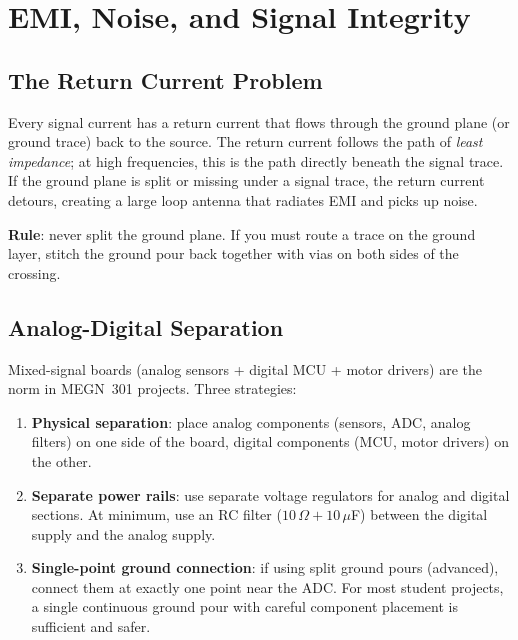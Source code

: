 \documentclass[11pt,letterpaper,twoside,openany]{book}
\begin{document}
\section{EMI, Noise, and Signal Integrity}

\subsection{The Return Current Problem}
Every signal current has a return current that flows through the ground plane (or ground trace) back to the source. The return current follows the path of \emph{least impedance}; at high frequencies, this is the path directly beneath the signal trace. If the ground plane is split or missing under a signal trace, the return current detours, creating a large loop antenna that radiates EMI and picks up noise.

\textbf{Rule}: never split the ground plane. If you must route a trace on the ground layer, stitch the ground pour back together with vias on both sides of the crossing.

\subsection{Analog-Digital Separation}
Mixed-signal boards (analog sensors + digital MCU + motor drivers) are the norm in MEGN~301 projects. Three strategies:
\begin{enumerate}[nosep,leftmargin=1.5em]
\item \textbf{Physical separation}: place analog components (sensors, ADC, analog filters) on one side of the board, digital components (MCU, motor drivers) on the other.
\item \textbf{Separate power rails}: use separate voltage regulators for analog and digital sections. At minimum, use an RC filter ($10\,\Omega + 10\,\mu$F) between the digital supply and the analog supply.
\item \textbf{Single-point ground connection}: if using split ground pours (advanced), connect them at exactly one point near the ADC. For most student projects, a single continuous ground pour with careful component placement is sufficient and safer.
\end{enumerate}
\end{document}
